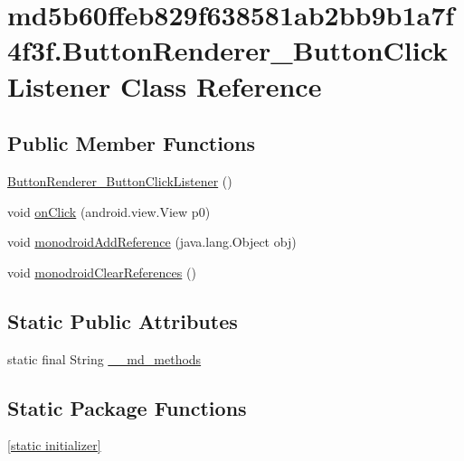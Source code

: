 \hypertarget{classmd5b60ffeb829f638581ab2bb9b1a7f4f3f_1_1_button_renderer___button_click_listener}{
\section{md5b60ffeb829f638581ab2bb9b1a7f4f3f.ButtonRenderer\_\-ButtonClickListener Class Reference}
\label{classmd5b60ffeb829f638581ab2bb9b1a7f4f3f_1_1_button_renderer___button_click_listener}
}
\subsection*{Public Member Functions}
\begin{CompactItemize}
\item 
\hyperlink{classmd5b60ffeb829f638581ab2bb9b1a7f4f3f_1_1_button_renderer___button_click_listener_b1bac88cf185273fe50fee009b173580}{ButtonRenderer\_\-ButtonClickListener} ()
\item 
void \hyperlink{classmd5b60ffeb829f638581ab2bb9b1a7f4f3f_1_1_button_renderer___button_click_listener_73c958e3551a985f92dbe6bde665dfbc}{onClick} (android.view.View p0)
\item 
void \hyperlink{classmd5b60ffeb829f638581ab2bb9b1a7f4f3f_1_1_button_renderer___button_click_listener_e77c28c48a6a3831721989497df67679}{monodroidAddReference} (java.lang.Object obj)
\item 
void \hyperlink{classmd5b60ffeb829f638581ab2bb9b1a7f4f3f_1_1_button_renderer___button_click_listener_412bbbc9b7d969906bb6c597440b57b6}{monodroidClearReferences} ()
\end{CompactItemize}
\subsection*{Static Public Attributes}
\begin{CompactItemize}
\item 
static final String \hyperlink{classmd5b60ffeb829f638581ab2bb9b1a7f4f3f_1_1_button_renderer___button_click_listener_0ba3db9168a35b7cd52aeb7a3d5cbf30}{\_\-\_\-md\_\-methods}
\end{CompactItemize}
\subsection*{Static Package Functions}
\begin{CompactItemize}
\item 
\hyperlink{classmd5b60ffeb829f638581ab2bb9b1a7f4f3f_1_1_button_renderer___button_click_listener_49a2906ee1cdcf97086ece8cda977ce1}{\mbox{[}static initializer\mbox{]}}
\end{CompactItemize}
